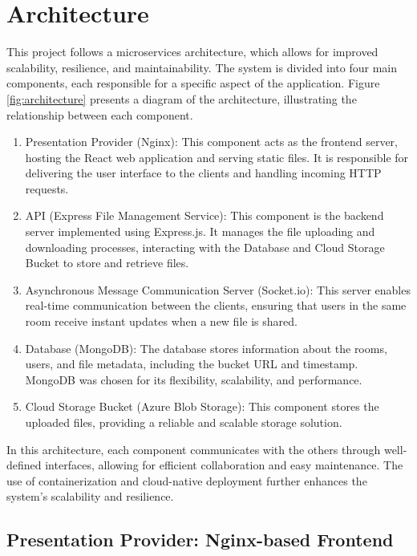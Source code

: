 \documentclass[a4paper,fleqn]{cas-dc}
\begin{document}
\section{Architecture}\label{sec:architecture}

This project follows a microservices architecture, which allows for improved scalability, resilience, and maintainability. The system is divided into four main components, each responsible for a specific aspect of the application. Figure \ref{fig:architecture} presents a diagram of the architecture, illustrating the relationship between each component.

\begin{enumerate}
    \item Presentation Provider (Nginx): This component acts as the frontend server, hosting the React web application and serving static files. It is responsible for delivering the user interface to the clients and handling incoming HTTP requests.
    \item API (Express File Management Service): This component is the backend server implemented using Express.js. It manages the file uploading and downloading processes, interacting with the Database and Cloud Storage Bucket to store and retrieve files.
    \item Asynchronous Message Communication Server (Socket.io): This server enables real-time communication between the clients, ensuring that users in the same room receive instant updates when a new file is shared.
    \item Database (MongoDB): The database stores information about the rooms, users, and file metadata, including the bucket URL and timestamp. MongoDB was chosen for its flexibility, scalability, and performance.
    \item Cloud Storage Bucket (Azure Blob Storage): This component stores the uploaded files, providing a reliable and scalable storage solution.
\end{enumerate}

In this architecture, each component communicates with the others through well-defined interfaces, allowing for efficient collaboration and easy maintenance. The use of containerization and cloud-native deployment further enhances the system's scalability and resilience.

\subsection{Presentation Provider: Nginx-based Frontend}
\end{document}
